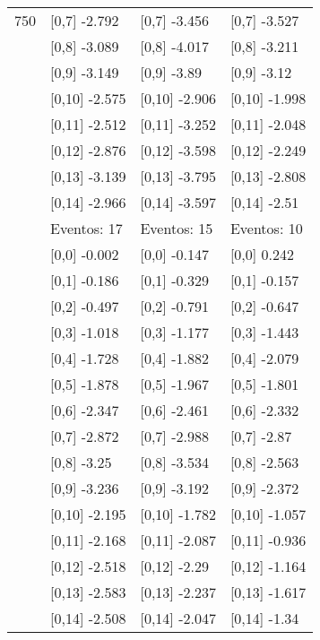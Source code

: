\begin{table}
\begin{tabular}[t]{llll}
750 & {}[0,7] -2.792 & {}[0,7] -3.456 & {}[0,7] -3.527\\
\addlinespace
 & {}[0,8] -3.089 & {}[0,8] -4.017 & {}[0,8] -3.211\\
 & {}[0,9] -3.149 & {}[0,9] -3.89 & {}[0,9] -3.12\\
 & {}[0,10] -2.575 & {}[0,10] -2.906 & {}[0,10] -1.998\\
 & {}[0,11] -2.512 & {}[0,11] -3.252 & {}[0,11] -2.048\\
 & {}[0,12] -2.876 & {}[0,12] -3.598 & {}[0,12] -2.249\\
\addlinespace
 & {}[0,13] -3.139 & {}[0,13] -3.795 & {}[0,13] -2.808\\
 & {}[0,14] -2.966 & {}[0,14] -3.597 & {}[0,14] -2.51\\
 & Eventos:  17 & Eventos:  15 & Eventos:  10\\
 & {}[0,0] -0.002 & {}[0,0] -0.147 & {}[0,0] 0.242\\
 & {}[0,1] -0.186 & {}[0,1] -0.329 & {}[0,1] -0.157\\
\addlinespace
 & {}[0,2] -0.497 & {}[0,2] -0.791 & {}[0,2] -0.647\\
 & {}[0,3] -1.018 & {}[0,3] -1.177 & {}[0,3] -1.443\\
 & {}[0,4] -1.728 & {}[0,4] -1.882 & {}[0,4] -2.079\\
 & {}[0,5] -1.878 & {}[0,5] -1.967 & {}[0,5] -1.801\\
 & {}[0,6] -2.347 & {}[0,6] -2.461 & {}[0,6] -2.332\\
\addlinespace
1000 & {}[0,7] -2.872 & {}[0,7] -2.988 & {}[0,7] -2.87\\
 & {}[0,8] -3.25 & {}[0,8] -3.534 & {}[0,8] -2.563\\
 & {}[0,9] -3.236 & {}[0,9] -3.192 & {}[0,9] -2.372\\
 & {}[0,10] -2.195 & {}[0,10] -1.782 & {}[0,10] -1.057\\
 & {}[0,11] -2.168 & {}[0,11] -2.087 & {}[0,11] -0.936\\
\addlinespace
 & {}[0,12] -2.518 & {}[0,12] -2.29 & {}[0,12] -1.164\\
 & {}[0,13] -2.583 & {}[0,13] -2.237 & {}[0,13] -1.617\\
 & {}[0,14] -2.508 & {}[0,14] -2.047 & {}[0,14] -1.34\\
\bottomrule
\end{tabular}
\end{table}
